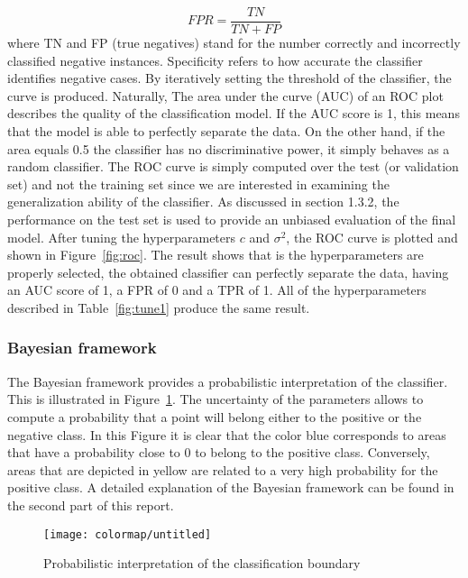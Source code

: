 \documentclass[conference,compsoc]{IEEEtran}
\begin{document}
\begin{equation}
FPR = \frac{TN}{TN+FP}
\end{equation}
where TN and FP (true negatives) stand for the number correctly and incorrectly classified negative instances. Specificity refers to how accurate the classifier identifies negative cases. By iteratively setting the threshold of the classifier, the curve is produced. Naturally, The area under the curve (AUC) of an ROC plot describes the quality of the classification model. If the AUC score is 1, this means that the model is able to perfectly separate the data. On the other hand, if the area equals 0.5 the classifier has no discriminative power, it simply behaves as a random classifier. The ROC curve is simply computed over the test (or validation set) and not the training set since we are interested in examining the generalization ability of the classifier. As discussed in section 1.3.2, the performance on the test set is used to provide an unbiased evaluation of the final model. 
After tuning the hyperparameters $c$ and $\sigma^2$, the ROC curve is plotted and shown in Figure~\ref{fig:roc}. The result shows that is the hyperparameters are properly selected, the obtained classifier can perfectly separate the data, having an AUC score of 1, a FPR of 0 and a TPR of 1. All of the hyperparameters described in Table~\ref{fig:tune1} produce the same result.

\subsubsection{Bayesian framework}

The Bayesian framework provides a probabilistic interpretation of the classifier. This is illustrated in Figure~\ref{fig:bay}. The uncertainty of the parameters allows to compute a probability that a point will belong either to the positive or the negative class. In this Figure it is clear that the color blue corresponds to areas that have a probability close to 0 to belong to the positive class. Conversely, areas that are depicted in yellow are related to a very high probability for the positive class. A detailed explanation of the Bayesian framework can be found in the second part of this report. 



\begin{figure}[]
			\centering
            \texttt{[image: colormap/untitled]}      
        \caption{Probabilistic interpretation of the classification boundary }                          
        \label{fig:bay}
    \end{figure}
    
\end{document}
